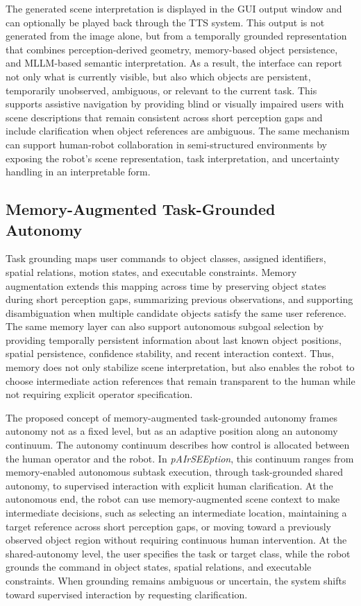 \documentclass[lettersize,journal]{IEEEtran}
\begin{document}
The generated scene interpretation is displayed in the GUI output window and can optionally be played back through the TTS system. This output is not generated from the image alone, but from a temporally grounded representation that combines perception-derived geometry, memory-based object persistence, and MLLM-based semantic interpretation. As a result, the interface can report not only what is currently visible, but also which objects are persistent, temporarily unobserved, ambiguous, or relevant to the current task. This supports assistive navigation by providing blind or visually impaired users with scene descriptions that remain consistent across short perception gaps and include clarification when object references are ambiguous. The same mechanism can support human-robot collaboration in semi-structured environments by exposing the robot's scene representation, task interpretation, and uncertainty handling in an interpretable form.

\subsection{Memory-Augmented Task-Grounded Autonomy}
\label{memory_augmented_task_grounding}

Task grounding maps user commands to object classes, assigned identifiers, spatial relations, motion states, and executable constraints. Memory augmentation extends this mapping across time by preserving object states during short perception gaps, summarizing previous observations, and supporting disambiguation when multiple candidate objects satisfy the same user reference. The same memory layer can also support autonomous subgoal selection by providing temporally persistent information about last known object positions, spatial persistence, confidence stability, and recent interaction context. Thus, memory does not only stabilize scene interpretation, but also enables the robot to choose intermediate action references that remain transparent to the human while not requiring explicit operator specification.

The proposed concept of memory-augmented task-grounded autonomy frames autonomy not as a fixed level, but as an adaptive position along an autonomy continuum. The autonomy continuum describes how control is allocated between the human operator and the robot. In \textit{pAIrSEEption}, this continuum ranges from memory-enabled autonomous subtask execution, through task-grounded shared autonomy, to supervised interaction with explicit human clarification. At the autonomous end, the robot can use memory-augmented scene context to make intermediate decisions, such as selecting an intermediate location, maintaining a target reference across short perception gaps, or moving toward a previously observed object region without requiring continuous human intervention. At the shared-autonomy level, the user specifies the task or target class, while the robot grounds the command in object states, spatial relations, and executable constraints. When grounding remains ambiguous or uncertain, the system shifts toward supervised interaction by requesting clarification.
\end{document}
